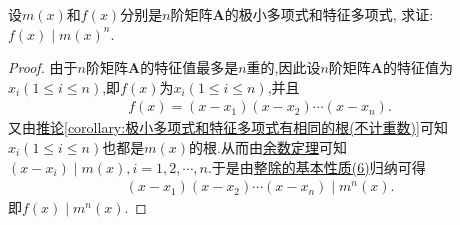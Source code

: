 \documentclass[../../main.tex]{subfiles}%
\begin{document}
\begin{example}
设\(m(x)\)和\(f(x)\)分别是\(n\)阶矩阵\(\boldsymbol{A}\)的极小多项式和特征多项式, 求证: \(f(x)\mid m(x)^n\).
\end{example}
\begin{proof}
由于\(n\)阶矩阵\(\boldsymbol{A}\)的特征值最多是\(n\)重的,因此设\(n\)阶矩阵\(\boldsymbol{A}\)的特征值为$x_i(1\leqslant  i\leqslant  n)$,即$f(x)$为$x_i(1\leqslant  i\leqslant  n)$,并且
\begin{align*}
f(x)=(x-x_1)(x-x_2)\cdots(x-x_n).
\end{align*}
又由\hyperref[corollary:极小多项式和特征多项式有相同的根(不计重数)]{推论\ref{corollary:极小多项式和特征多项式有相同的根(不计重数)}}可知$x_i(1\leqslant  i\leqslant  n)$也都是$m(x)$的根.从而由\hyperref[theorem:余数定理]{余数定理}可知$(x-x_i)\mid m(x),i=1,2,\cdots,n$.于是由\hyperref[proposition:整除的基本性质]{整除的基本性质(6)}归纳可得
\begin{align*}
(x-x_1)(x-x_2)\cdots(x-x_n)\mid m^n(x).
\end{align*}
即$f(x)\mid m^n(x)$.
\end{proof}
\end{document}
